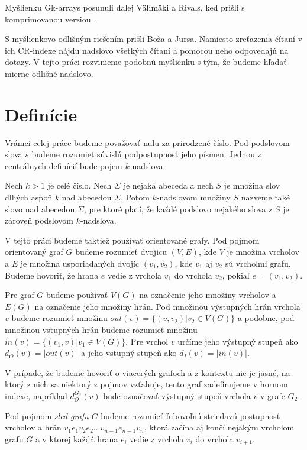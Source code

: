 Myšlienku Gk-arrays posunuli ďalej Välimäki a Rivals, keď prišli s komprimovanou
verziou \cite{comp_gk_arrays}.

S myšlienkovo odlišným riešením prišli Boža a Jursa. Namiesto zreťazenia čítaní v
ich CR-indexe \cite{cr_index} nájdu nadslovo všetkých čítaní a pomocou neho
odpovedajú na dotazy. V tejto práci rozvinieme podobnú myšlienku s tým, že budeme
hľadať mierne odlišné nadslovo.

\section{Definície}

Vrámci celej práce budeme považovať nulu za prirodzené číslo. Pod podslovom slova $s$
budeme rozumieť súvislú podpostupnosť jeho písmen. Jednou z centrálnych definícií bude
pojem $k$-nadslova.

\begin{defn}
    Nech $k > 1$ je celé číslo. Nech $\Sigma$ je nejaká abeceda a nech $S$ je množina
    slov dlhých aspoň $k$ nad abecedou $\Sigma$. Potom $k$-nadslovom množiny $S$ nazveme také slovo
    nad abecedou $\Sigma$, pre ktoré platí, že každé podslovo nejakého slova z $S$ je
    zároveň podslovom $k$-nadslova.
\end{defn}

V tejto práci budeme taktiež používať orientované grafy. Pod pojmom orientovaný graf $G$ budeme
rozumieť dvojicu $(V, E)$, kde $V$ je množina vrcholov a $E$ je množina usporiadaných
dvojíc $(v_1, v_2)$, kde $v_1$ aj $v_2$ sú vrcholmi grafu. Budeme hovoriť, že hrana $e$ vedie
z vrchola $v_1$ do vrchola $v_2$, pokiaľ $e = (v_1, v_2)$.

Pre graf $G$ budeme používať $V(G)$ na označenie jeho množiny vrcholov a $E(G)$ na označenie jeho
množiny hrán. Pod množinou výstupných hrán
vrchola $v$ budeme rozumieť množinu $out(v) = \{ (v, v_2) | v_2 \in V(G) \}$ a podobne,
pod množinou vstupných hrán budeme rozumieť množinu $in(v) = \{ (v_1, v) | v_1 \in V(G) \}$.
Pre vrchol $v$ určíme jeho výstupný stupeň ako $d_O(v) = |out(v)|$ a jeho vstupný stupeň ako $d_I(v) = |in(v)|$.

V prípade, že budeme hovoriť o viacerých grafoch a z kontextu nie je jasné, na ktorý z nich
sa niektorý z pojmov vzťahuje, tento graf zadefinujeme v hornom indexe, napríklad
$d_O^{G_2}(v)$ bude označovať výstupný stupeň vrchola $v$ v grafe $G_2$.

Pod pojmom \emph{sled grafu $G$} budeme rozumieť ľubovoľnú striedavú postupnosť vrcholov
a hrán $v_1 e_1 v_2 e_2 \ldots v_{n-1} e_{n-1} v_n$, ktorá začína aj končí nejakým vrcholom
grafu $G$ a v ktorej každá hrana $e_i$ vedie z vrchola $v_i$ do vrchola $v_{i+1}$.

